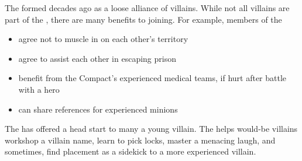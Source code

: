 \documentclass[blue]{LRSguildcamp1}
\begin{document}
\name{\bVillainCompact{}}

The \cVillainCompact{\intro} formed decades ago as a loose alliance of villains.  While not all villains are part of the \cVillainCompact{}, there are many benefits to joining.  For example, members of the \cVillainCompact{}

\begin{itemize}
\item agree not to muscle in on each other's territory
\item agree to assist each other in escaping prison
\item benefit from the Compact's experienced medical teams, if hurt after battle with a hero
\item can share references for experienced minions
\end{itemize}

The \cVillainCompact{} has offered a head start to many a young villain.  The \cVillainCompact{} helps would-be villains workshop a villain name, learn to pick locks, master a menacing laugh, and sometimes, find placement as a sidekick to a more experienced villain.
\end{document}
